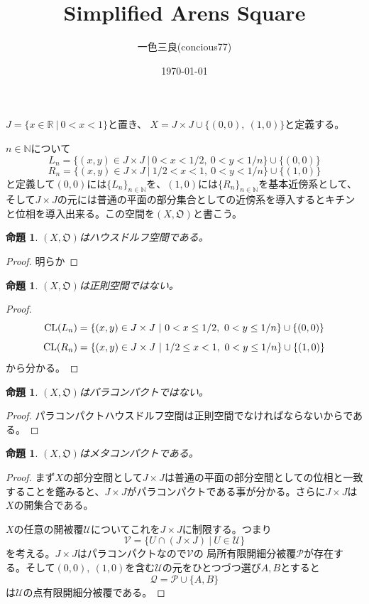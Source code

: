 \documentclass[leqno]{jsarticle}
\title{Simplified Arens Square}
\author{一色三良(concious77)}
\date{\today}
\newtheorem{prop}[thm]{命題}
\newcommand{\nn}{\mathbb{N}}
\newcommand{\rr}{\mathbb{R}}
\newcommand{\cl}{\text{{\rm CL}}}
\begin{document}
\maketitle
$J=\{x\in \rr\ |\ 0<x<1\}$と置き、
$X=J\times J\cup \{(0,0),\ (1,0)\}$と定義する。\par
$n\in \nn$について
\[
L_n=\{(x,y)\in J\times J\ |\ 0<x<1/2,\ 0<y<1/n\}\cup \{(0,0)\}
\]
\[
R_n=\{(x,y)\in J\times J\ |\ 1/2<x<1,\ 0<y<1/n\}\cup \{(1,0)\}
\]
と定義して$(0,0)$には$\{L_n\}_{n\in \nn}$を、$(1,0)$には$\{R_n\}_{n\in \nn}$を基本近傍系として、そして$J\times J$の元には普通の平面の部分集合としての近傍系を導入するとキチンと位相を導入出来る。この空間を$(X,\mathfrak{O})$と書こう。

\begin{prop}
$(X,\mathfrak{O})$はハウスドルフ空間である。
\end{prop}
\begin{proof}
明らか
\end{proof}


\begin{prop}
$(X,\mathfrak{O})$は正則空間ではない。
\end{prop}
\begin{proof}
\[
\cl(L_n)=\{(x,y)\in J\times J\ |\ 0<x\le 1/2,\ 0<y\le 1/n\}\cup \{(0,0)\}
\]
\[
\cl(R_n)=\{(x,y)\in J\times J\ |\ 1/2\le x<1,\ 0<y\le 1/n\}\cup \{(1,0)\}
\]
から分かる。
\end{proof}


\begin{prop}
$(X,\mathfrak{O})$はパラコンパクトではない。
\end{prop}
\begin{proof}
パラコンパクトハウスドルフ空間は正則空間でなければならないからである。
\end{proof}


\begin{prop}
$(X,\mathfrak{O})$はメタコンパクトである。
\end{prop}
\begin{proof}
まず$X$の部分空間として$J\times J$は普通の平面の部分空間としての位相と一致することを鑑みると、$J\times J$がパラコンパクトである事が分かる。さらに$J\times J$は$X$の開集合である。\par
$X$の任意の開被覆$\mathcal{U}$についてこれを$J\times J$に制限する。つまり
\[
\mathcal{V}=\{U\cap (J\times J)\ |\ U\in \mathcal{U}\}
\]
を考える。$J\times J$はパラコンパクトなので$\mathcal{V}$の
局所有限開細分被覆$\mathcal{P}$が存在する。そして$(0,0),\ (1,0)$を含む$\mathcal{U}$の元をひとつづつ選び$A,B$とすると
\[
\mathcal{Q}=\mathcal{P}\cup \{A,B\}
\]は$\mathcal{U}$の点有限開細分被覆である。
\end{proof}
\end{document}

